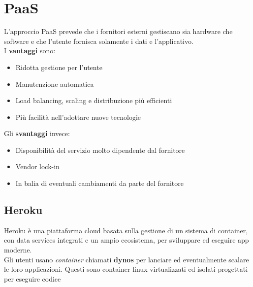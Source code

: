 \newpage
\section{PaaS}
L'approccio PaaS prevede che i fornitori esterni gestiscano sia hardware che software e che l'utente fornisca solamente i dati e l'applicativo.\\
I \textbf{vantaggi} sono:
\begin{itemize}
	\item Ridotta gestione per l'utente
	\item Manutenzione automatica
	\item Load balancing, scaling e distribuzione più efficienti
	\item Più facilità nell'adottare nuove tecnologie
\end{itemize}
Gli \textbf{svantaggi} invece:
\begin{itemize} 
	\item Disponibilità del servizio molto dipendente dal fornitore
	\item Vendor lock-in
	\item In balia di eventuali cambiamenti da parte del fornitore
\end{itemize}
\subsection{Heroku}
Heroku è una piattaforma cloud basata sulla gestione di un sistema di container, con data services integrati e un ampio ecosistema, per sviluppare ed eseguire app moderne.\\
Gli utenti usano \textit{container} chiamati \textbf{dynos} per lanciare ed eventualmente scalare le loro applicazioni. Questi sono container linux virtualizzati ed isolati progettati per eseguire codice 